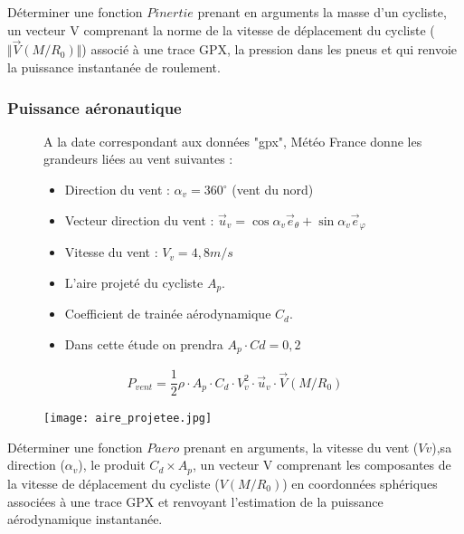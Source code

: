 \question{} Déterminer une fonction $Pinertie$ prenant en arguments la masse d'un cycliste, un vecteur V comprenant la norme de la vitesse de déplacement du cycliste ($\Vert \overrightarrow{V}(M/R_0)\Vert$) associé à une trace GPX, la pression dans les pneus et qui renvoie la puissance instantanée de roulement.

\subsubsection*{Puissance aéronautique}


\begin{figure}[!htb]
\begin{minipage}{0.5\textwidth}
A la date correspondant aux données "gpx", Météo France donne les grandeurs liées au vent suivantes :
\begin{itemize}
\item Direction du vent : $\alpha_v=360^{\circ}$ (vent du nord)
\item Vecteur direction du vent : $\overrightarrow{u}_v=\cos\alpha_v\overrightarrow{e}_{\theta}+\sin\alpha_v\overrightarrow{e}_{\varphi}$
\item Vitesse du vent : $V_v=4,8m/s$
\item L'aire projeté du cycliste $A_p$.
\item Coefficient de trainée aérodynamique $C_d$.
\item Dans cette étude on prendra $A_p\cdot Cd=0,2$
\end{itemize}

\begin{align*}
P_{vent}=\dfrac{1}{2}\rho\cdot A_p\cdot C_d\cdot V_v^2\cdot \overrightarrow{u}_v\cdot \overrightarrow{V}(M/R_0)
\end{align*}
\end{minipage}
\begin{minipage}{0.5\textwidth}
\begin{center}
\texttt{[image: aire\_projetee.jpg]}
\end{center}
\end{minipage}
\end{figure}


\question{} Déterminer une fonction $Paero$ prenant en arguments, la vitesse du vent ($Vv$),sa direction ($\alpha_v$), le produit $C_d\times A_p$, un vecteur V comprenant les composantes de la vitesse de déplacement du cycliste ($V(M/R_0)$) en coordonnées sphériques associées à une trace GPX et renvoyant l'estimation de la puissance aérodynamique instantanée.  

